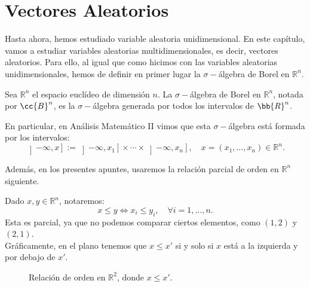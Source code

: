 \chapter{Vectores Aleatorios}

Hasta ahora, hemos estudiado variable aleatoria unidimensional.
En este capítulo, vamos a estudiar variables aleatorias multidimensionales, es decir, vectores aleatorios.
Para ello, al igual que como hicimos con las variables aleatorias unidimensionales, hemos de definir en primer lugar la $\sigma-$álgebra de Borel en $\mathbb{R}^n$.
\begin{definicion}
    Sea $\mathbb{R}^n$ el espacio euclídeo de dimensión $n$.
    La $\sigma-$álgebra de Borel en $\mathbb{R}^n$, notada por $\cc{B}^n$, es la $\sigma-$álgebra generada por todos los intervalos de $\bb{R}^n$.
\end{definicion}

En particular, en Análisis Matemático II vimos que esta $\sigma-$álgebra está formada por los intervalos:
\begin{equation*}
    \left]-\infty, x\right] := \left]-\infty, x_1\right] \times \cdots \times \left]-\infty, x_n\right], \quad x = (x_1, \ldots, x_n) \in \mathbb{R}^n.
\end{equation*}

Además, en los presentes apuntes, usaremos la relación parcial de orden en $\mathbb{R}^n$ siguiente.
\begin{notacion}
    Dado $x,y\in \mathbb{R}^n$, notaremos:
    \begin{equation*}
        x\leq y \iff x_i\leq y_i, \quad \forall i=1, \ldots, n.
    \end{equation*}
    Esta es parcial, ya que no podemos comparar ciertos elementos, como $(1, 2)$ y $(2, 1)$.\\

    Gráficamente, en el plano tenemos que $x\leq x'$ si y solo si $x$ está a la izquierda y por debajo de $x'$.
    \begin{figure}[H]
        \centering
        \caption{Relación de orden en $\mathbb{R}^2$, donde $x\leq x'$.}
    \end{figure}
\end{notacion}

